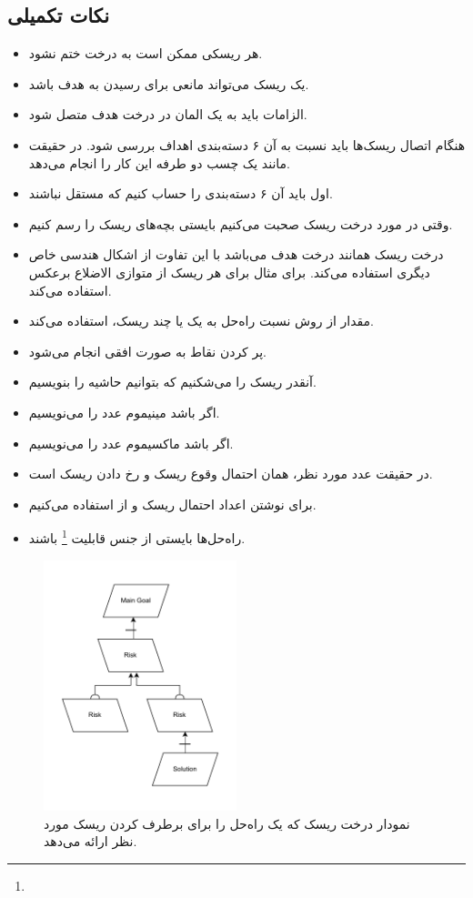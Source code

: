 \subsection*{نکات تکمیلی}

\begin{itemize}
    \item هر ریسکی ممکن است به درخت ختم نشود.
    \item یک ریسک می‌تواند مانعی برای رسیدن به هدف باشد.
    \item الزامات باید به یک المان در درخت هدف متصل شود.
    \item هنگام اتصال ریسک‌ها باید نسبت به آن ۶ دسته‌بندی اهداف بررسی شود. در
    حقیقت مانند یک چسب دو طرفه این کار را انجام می‌دهد.
    \item اول باید آن ۶ دسته‌بندی را حساب کنیم که مستقل نباشند.
    \item وقتی در مورد درخت ریسک صحبت می‌کنیم بایستی بچه‌های ریسک را رسم کنیم.
    \item درخت ریسک همانند درخت هدف می‌باشد با این تفاوت از اشکال هندسی خاص
    دیگری استفاده می‌کند. برای مثال برای هر ریسک از متوازی الاضلاع برعکس استفاده
    می‌کند.
    \item مقدار  از روش  نسبت راه‌حل به یک یا چند ریسک،
    استفاده می‌کند.
    \item پر کردن نقاط به صورت افقی انجام می‌شود.
    \item آنقدر ریسک را می‌شکنیم که بتوانیم حاشیه را بنویسیم.
    \item اگر  باشد مینیموم عدد را می‌نویسیم.
    \item اگر  باشد ماکسیموم عدد را می‌نویسیم.
    \item در حقیقت عدد مورد نظر، همان احتمال وقوع ریسک و  رخ
    دادن ریسک است.
    \item برای نوشتن اعداد احتمال ریسک و  از 
    استفاده می‌کنیم.
    \item راه‌حل‌ها بایستی از جنس قابلیت \footnote{} باشند.
\end{itemize}

\begin{figure}[H]
    \centering
    \includegraphics[width=0.5\textwidth]{assets/solution_for_risk_tree.drawio.pdf}
    \caption{نمودار درخت ریسک که یک راه‌حل را برای برطرف کردن ریسک مورد نظر
    ارائه می‌دهد.}
\end{figure}

